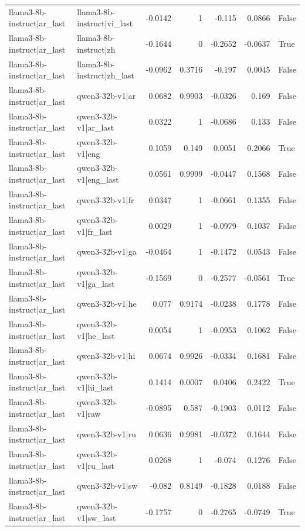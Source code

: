 \begin{table}
\begin{tabular}{l l r r r r l}
llama3-8b-instruct|ar_last & llama3-8b-instruct|vi_last & -0.0142 & 1 & -0.115 & 0.0866 & False \\
llama3-8b-instruct|ar_last & llama3-8b-instruct|zh & -0.1644 & 0 & -0.2652 & -0.0637 & True \\
llama3-8b-instruct|ar_last & llama3-8b-instruct|zh_last & -0.0962 & 0.3716 & -0.197 & 0.0045 & False \\
llama3-8b-instruct|ar_last & qwen3-32b-v1|ar & 0.0682 & 0.9903 & -0.0326 & 0.169 & False \\
llama3-8b-instruct|ar_last & qwen3-32b-v1|ar_last & 0.0322 & 1 & -0.0686 & 0.133 & False \\
llama3-8b-instruct|ar_last & qwen3-32b-v1|eng & 0.1059 & 0.149 & 0.0051 & 0.2066 & True \\
llama3-8b-instruct|ar_last & qwen3-32b-v1|eng_last & 0.0561 & 0.9999 & -0.0447 & 0.1568 & False \\
llama3-8b-instruct|ar_last & qwen3-32b-v1|fr & 0.0347 & 1 & -0.0661 & 0.1355 & False \\
llama3-8b-instruct|ar_last & qwen3-32b-v1|fr_last & 0.0029 & 1 & -0.0979 & 0.1037 & False \\
llama3-8b-instruct|ar_last & qwen3-32b-v1|ga & -0.0464 & 1 & -0.1472 & 0.0543 & False \\
llama3-8b-instruct|ar_last & qwen3-32b-v1|ga_last & -0.1569 & 0 & -0.2577 & -0.0561 & True \\
llama3-8b-instruct|ar_last & qwen3-32b-v1|he & 0.077 & 0.9174 & -0.0238 & 0.1778 & False \\
llama3-8b-instruct|ar_last & qwen3-32b-v1|he_last & 0.0054 & 1 & -0.0953 & 0.1062 & False \\
llama3-8b-instruct|ar_last & qwen3-32b-v1|hi & 0.0674 & 0.9926 & -0.0334 & 0.1681 & False \\
llama3-8b-instruct|ar_last & qwen3-32b-v1|hi_last & 0.1414 & 0.0007 & 0.0406 & 0.2422 & True \\
llama3-8b-instruct|ar_last & qwen3-32b-v1|raw & -0.0895 & 0.587 & -0.1903 & 0.0112 & False \\
llama3-8b-instruct|ar_last & qwen3-32b-v1|ru & 0.0636 & 0.9981 & -0.0372 & 0.1644 & False \\
llama3-8b-instruct|ar_last & qwen3-32b-v1|ru_last & 0.0268 & 1 & -0.074 & 0.1276 & False \\
llama3-8b-instruct|ar_last & qwen3-32b-v1|sw & -0.082 & 0.8149 & -0.1828 & 0.0188 & False \\
llama3-8b-instruct|ar_last & qwen3-32b-v1|sw_last & -0.1757 & 0 & -0.2765 & -0.0749 & True \\

\end{tabular}
\end{table}
